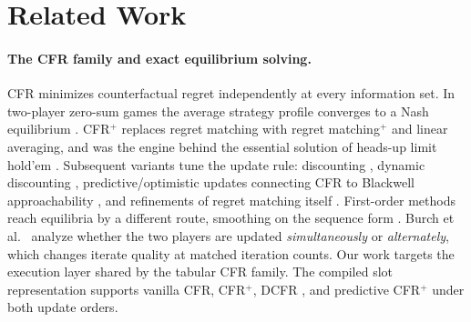 \section{Related Work}
\label{sec:related}

\paragraph{The CFR family and exact equilibrium solving.}
CFR \cite{zinkevich2007regret} minimizes counterfactual regret independently at every
information set. In two-player zero-sum games the average strategy profile converges
to a Nash equilibrium \cite{nash1950equilibrium}. CFR$^{+}$
\cite{tammelin2014solving} replaces regret matching \cite{hart2000simple} with regret matching$^{+}$
and linear averaging, and was the engine behind the essential solution of heads-up
limit hold'em \cite{tammelin2015solving,bowling2015heads}.
Subsequent variants tune the update rule: discounting \cite{brown2019solving},
dynamic discounting \cite{xu2024dynamic}, predictive/optimistic updates connecting
CFR to Blackwell approachability
\cite{farina2021faster,farina2019optimistic,farina2019stable,xu2024minimizing}, and
refinements of regret matching itself \cite{farina2023regret,meng2026a}.
First-order methods reach equilibria by a different route, smoothing
\cite{hoda2010smoothing,nesterov2005excessive} on the sequence form
\cite{koller1997representations}. Burch et al.\ \cite{burch2019revisiting} analyze
whether the two players are updated \emph{simultaneously} or \emph{alternately},
which changes iterate quality at matched iteration counts. Our work targets the
execution layer shared by the tabular CFR family. The compiled slot representation
supports vanilla CFR, CFR$^{+}$, DCFR \cite{brown2019solving}, and predictive
CFR$^{+}$ \cite{farina2021faster} under both update orders.

